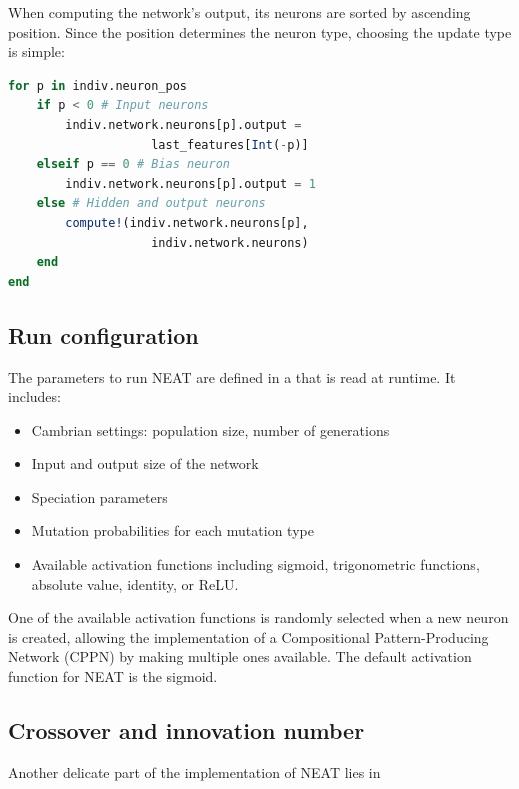 When computing the network's output, its neurons are sorted by ascending position. Since the position determines the neuron type, choosing the update type is simple:

\begin{lstlisting}[language=Julia, caption=NEAT network processing (\href{https://github.com/TemplierPaul/NeuroEvolution.jl/blob/master/src/process.jl}{\color{blue}{Source}})]
for p in indiv.neuron_pos
    if p < 0 # Input neurons
        indiv.network.neurons[p].output = 
                    last_features[Int(-p)]
    elseif p == 0 # Bias neuron
        indiv.network.neurons[p].output = 1
    else # Hidden and output neurons
        compute!(indiv.network.neurons[p], 
                    indiv.network.neurons)
    end
end
\end{lstlisting}

\subsection{Run configuration}

The parameters to run NEAT are defined in a \href{https://github.com/TemplierPaul/NeuroEvolution.jl/blob/master/cfg/test.yaml}{\color{blue}{YAML file}}  that is read at runtime. It includes:

\begin{itemize}
    \item Cambrian settings: population size, number of generations
    \item Input and output size of the network
    \item Speciation parameters
    \item Mutation probabilities for each mutation type
    \item Available activation functions including sigmoid, trigonometric functions, absolute value, identity, or ReLU. 
\end{itemize}

One of the available activation functions is randomly selected when a new neuron is created, allowing the implementation of a Compositional Pattern-Producing Network (CPPN) by making multiple ones available. The default activation function for NEAT is the sigmoid. 

\subsection{Crossover and innovation number}
Another delicate part of the implementation of NEAT lies in 

